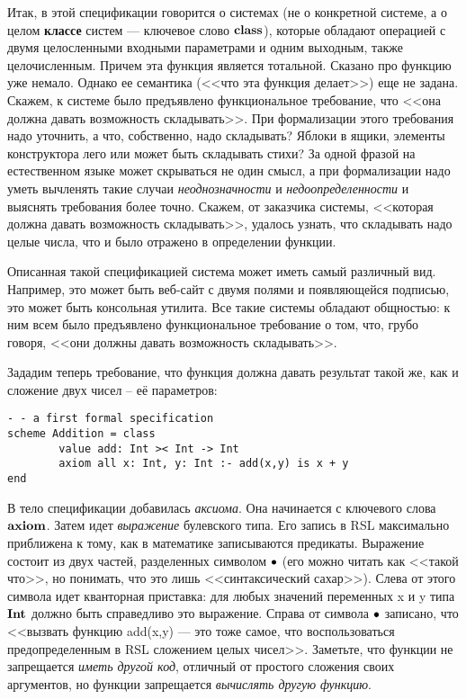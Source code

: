 \documentclass[12pt]{extreport}
\begin{document}
Итак, в этой спецификации говорится о системах (не о конкретной системе, а о целом \textbf{классе} систем --- ключевое слово $\mathop{\textbf{class}}$), которые обладают операцией с двумя целосленными входными параметрами и одним выходным, также целочисленным. Причем эта функция является тотальной. Сказано про функцию уже немало. Однако ее семантика (<<что эта функция делает>>) еще не задана. Скажем, к системе было предъявлено функциональное требование, что <<она должна давать возможность складывать>>. При формализации этого требования надо уточнить, а что, собственно, надо складывать? Яблоки в ящики, элементы конструктора лего или может быть складывать стихи? За одной фразой на естественном языке может скрываться не один смысл, а при формализации надо уметь вычленять такие случаи \emph{неоднозначности} и \emph{недоопределенности} и выяснять требования более точно. Скажем, от заказчика системы, <<которая должна давать возможность складывать>>, удалось узнать, что складывать надо целые числа, что и было отражено в определении функции.

Описанная такой спецификацией система может иметь самый различный вид. Например, это может быть веб-сайт с двумя полями и появляющейся подписью, это может быть консольная утилита. Все такие системы обладают общностью: к ним всем было предъявлено функциональное требование о том, что, грубо говоря, <<они должны давать возможность складывать>>.

Зададим теперь требование, что функция должна давать результат такой же, как и сложение двух чисел -- её параметров:

\begin{lstlisting}
- - a first formal specification
scheme Addition = class
        value add: Int >< Int -> Int
        axiom all x: Int, y: Int :- add(x,y) is x + y
end
\end{lstlisting}

В тело спецификации добавилась \emph{аксиома}. Она начинается с ключевого слова $\mathop{\textbf{axiom}}$. Затем идет \emph{выражение} булевского типа. Его запись в RSL максимально приближена к тому, как в математике записываются предикаты. Выражение состоит из двух частей, разделенных символом $\mathop{\bullet}$ (его можно читать как <<такой что>>, но понимать, что это лишь <<синтаксический сахар>>). Слева от этого символа идет кванторная приставка: для любых значений переменных x и y типа $\textbf{Int}$ должно быть справедливо это выражение. Справа от символа $\mathop{\bullet}$ записано, что <<вызвать функцию add(x,y) --- это тоже самое, что воспользоваться предопределенным в RSL сложением целых чисел>>. Заметьте, что функции не запрещается \emph{иметь другой код}, отличный от простого сложения своих аргументов, но функции запрещается \emph{вычислять другую функцию}.
\end{document}

